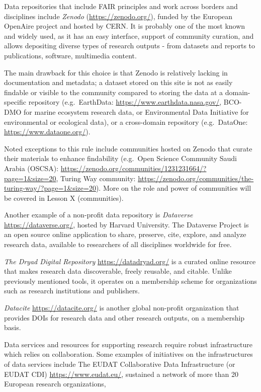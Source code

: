 \documentclass[
  letterpaper,
  DIV=11,
  numbers=noendperiod]{scrreport}
\begin{document}
Data repositories that include FAIR principles and work across borders
and disciplines include \emph{Zenodo} (\url{https://zenodo.org/}),
funded by the European OpenAire project and hosted by CERN. It is
probably one of the most known and widely used, as it has an easy
interface, support of community curation, and allows depositing diverse
types of research outputs - from datasets and reports to publications,
software, multimedia content.

The main drawback for this choice is that Zenodo is relatively lacking
in documentation and metadata; a dataset stored on this site is not as
easily findable or visible to the community compared to storing the data
at a domain-specific repository (e.g.~EarthData:
\url{https://www.earthdata.nasa.gov/}, BCO-DMO for marine ecosystem
research data, or Environmental Data Initiative for environmental or
ecological data), or a cross-domain repository (e.g.~DataOne:
\url{https://www.dataone.org/}).

Noted exceptions to this rule include communities hosted on Zenodo that
curate their materials to enhance findability (e.g.~Open Science
Community Saudi Arabia (OSCSA):
\url{https://zenodo.org/communities/1231231664/?page=1\&size=20}, Turing
Way community:
\url{https://zenodo.org/communities/the-turing-way/?page=1\&size=20}).
More on the role and power of communities will be covered in Lesson X
(communities).

Another example of a non-profit data repository is \emph{Dataverse}
\url{https://dataverse.org/}, hosted by Harvard University. The
Dataverse Project is an open source online application to share,
preserve, cite, explore, and analyze research data, available to
researchers of all disciplines worldwide for free.

\emph{The Dryad Digital Repository} \url{https://datadryad.org/} is a
curated online resource that makes research data discoverable, freely
reusable, and citable. Unlike previously mentioned tools, it operates on
a membership scheme for organizations such as research institutions and
publishers.

\emph{Datacite }\url{https://datacite.org/} is another global non-profit
organization that provides DOIs for research data and other research
outputs, on a membership basis.

Data services and resources for supporting research require robust
infrastructure which relies on collaboration. Some examples of
initiatives on the infrastructures of data services include The EUDAT
Collaborative Data Infrastructure (or EUDAT CDI)
\url{https://www.eudat.eu/}, sustained a network of more than 20
European research organizations,
\end{document}
